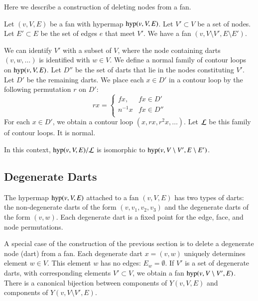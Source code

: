 
Here we describe a construction of deleting nodes from a 
fan.  


Let $(v,V,E)$ be a fan with hypermap ${\operatorname{hyp}}(v,V,E)$.
Let $V'\subset V$ be a set of nodes. 
Let $E'\subset E$ be the set of edges $e$ that meet $V'$.
We have a fan $(v,V\setminus V',E\setminus E')$.

We can identify $V'$ with a subset of $V$, where
the node containing darts $(v,w,\ldots)$ is identified with $w\in V$.
We define a normal family of contour loops on 
${\operatorname{hyp}}(v,V,E)$.  Let $D''$ be the set of darts that lie in the
nodes constituting $V'$.  Let $D'$ be the remaining darts.
We place each $x\in D'$ in a contour
loop by the following permutation $r$ on $D'$:
    $$r x =
    \begin{cases}
    f x, & f x \in D'\\
    n^{-1} x & f x \in D''\\
    \end{cases}
    $$
For each $x\in D'$, we obtain a contour loop $(x,r x, r^2 x,\ldots)$.
Let $\cal L$ be this family of contour loops.  It is normal.

\begin{lemma} In this context,
${\operatorname{hyp}}(v,V,E)/{\cal L}$ is isomorphic to 
${\operatorname{hyp}}(v,V\setminus V',E\setminus E')$.
\end{lemma}



\subsection{Degenerate Darts}


The hypermap ${\operatorname{hyp}}(v,V,E)$ attached to a fan $(v,V,E)$
has two types of darts: the non-degenerate darts of the form
$(v,v_1,v_2,v_3)$ and the degenerate darts of the form $(v,w)$.
Each degenerate dart is a  fixed point for the edge, face, and node
permutations.

A special case of the construction of the previous section
is to delete a degenerate node (dart) from a fan.
Each degenerate dart $x=(v,w)$ uniquely determines element
$w\in V$.  This element $w$ has no edges: $E_w = \emptyset$.
If $V'$ is a set of degenerate darts, with corresponding elements
$V'\subset V$, 
we obtain a fan
${\operatorname{hyp}}(v,V\setminus V',E)$.  There is a canonical bijection
between components of $Y(v,V,E)$ and components of $Y(v,V\setminus V',E)$.

